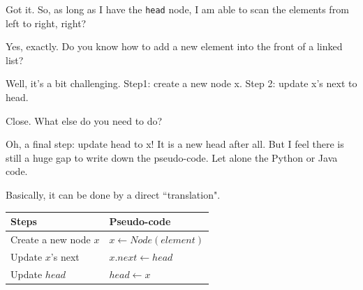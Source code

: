 \documentclass[aspectratio=169, 14pt]{beamer}
\begin{document}
\begin{frame}[fragile]

\begin{leftbubbles}
Got it. So, as long as I have the \alert{\texttt{head}} node, I am able to scan the elements from left to right, right?
\end{leftbubbles}

\begin{rightbubbles}
Yes, exactly. Do you know how to add a new element into the front of a linked list?
\end{rightbubbles}

\begin{leftbubbles}
Well, it's a bit challenging. Step1: create a new node \alert{x}. Step 2: update \alert{x}'s next to \alert{head}.
\end{leftbubbles}

\begin{rightbubbles}
Close. What else do you need to do?
\end{rightbubbles}

\end{frame}

\begin{frame}

    \begin{leftbubbles}
Oh, a final step: update \alert{head} to \alert{x}! It is a new head after all. But I feel there is still a huge gap to write down the pseudo-code. Let alone the Python or Java code.
    \end{leftbubbles}

\begin{rightbubbles}
Basically, it can be done by a direct ``translation".
\end{rightbubbles}

\begin{table}
    \begin{tabular}{ll}
      \toprule
      Steps & Pseudo-code \\
      \midrule
      Create a new node $x$ & $x \gets Node(element)$ \\
      Update $x$'s next & $x.next \gets head$ \\
      Update $head$ & $head \gets x$\\
      \bottomrule
    \end{tabular}
\end{table}

\end{frame}
\end{document}
